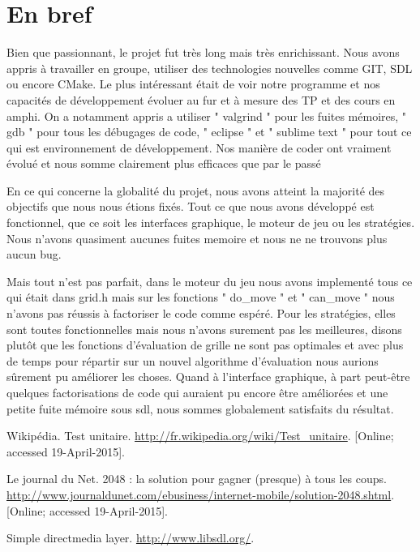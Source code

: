 \documentclass[12pt]{article}
\begin{document}
\section{En bref}
Bien que passionnant, le projet fut très long mais très enrichissant. Nous
avons appris à travailler en groupe, utiliser des technologies nouvelles comme
GIT, SDL ou encore CMake. Le plus intéressant était de voir notre programme et nos capacités
de développement évoluer au fur et à mesure des TP et des cours en amphi.
On a notamment appris a utiliser " valgrind " pour les fuites mémoires, " gdb " pour tous
les débugages de code, " eclipse " et " sublime text " pour
tout ce qui est environnement de développement. Nos manière de coder ont vraiment
évolué et nous somme clairement plus efficaces que par le passé
\par En ce qui concerne la globalité du projet, nous avons atteint la
majorité des objectifs que nous nous étions fixés. Tout ce que nous avons
développé est fonctionnel, que ce soit les interfaces graphique, le moteur
de jeu ou les stratégies. Nous n'avons quasiment aucunes fuites memoire et nous ne
ne trouvons plus aucun bug. 
\par Mais tout n'est pas parfait, dans le moteur du jeu
nous avons implementé tous ce qui était dans grid.h mais sur les fonctions
" do\_move " et " can\_move " nous n'avons pas réussis à
factoriser le code comme espéré. Pour les stratégies, elles sont toutes
fonctionnelles mais nous n'avons surement pas les meilleures, disons plutôt que les fonctions
d'évaluation de grille ne sont pas optimales et avec plus de temps pour répartir sur un nouvel
algorithme d'évaluation nous aurions sûrement pu améliorer les choses.
Quand à l'interface graphique, à part peut-être quelques factorisations de code qui auraient
pu encore être améliorées et une petite fuite mémoire sous sdl, nous sommes globalement satisfaits
du résultat.

\newpage

\begin{thebibliography}{1}
   Wikipédia. Test unitaire.
  \url{http://fr.wikipedia.org/wiki/Test_unitaire}. [Online; accessed
  19-April-2015].

   Le journal du Net. 2048 : la solution pour gagner (presque) à
  tous les coups.
  \url{http://www.journaldunet.com/ebusiness/internet-mobile/solution-2048.shtml}. [Online; accessed 19-April-2015].

   Simple directmedia layer. \url{http://www.libsdl.org/}.
\end{thebibliography}
\end{document}
